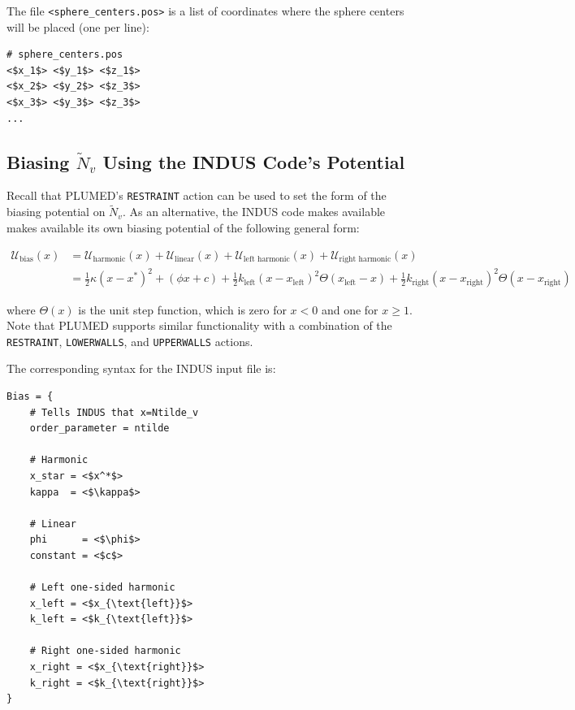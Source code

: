 \documentclass[11pt,notitlepage]{article}
\begin{document}
The file \texttt{<sphere\_centers.pos>} is a list of coordinates where the sphere centers will be placed (one per line):

\begin{lstlisting}
# sphere_centers.pos
<$x_1$> <$y_1$> <$z_1$>
<$x_2$> <$y_2$> <$z_3$>
<$x_3$> <$y_3$> <$z_3$>
...
\end{lstlisting}


\subsection{Biasing $\tilde{N}_v$ Using the INDUS Code's Potential}

Recall that PLUMED's \texttt{RESTRAINT} action can be used to set the form of the biasing potential on $\tilde{N}_v$. As an alternative, the INDUS code makes available makes available its own biasing potential of the following general form:

\begin{align}
	\mathcal{U}_{\text{bias}}(x) 
	&= \mathcal{U}_{\text{harmonic}}(x) + \mathcal{U}_{\text{linear}}(x)
	     + \mathcal{U}_{\text{left harmonic}}(x) + \mathcal{U}_{\text{right harmonic}}(x) \\
	\label{eqn:generalbias}
	&= \frac{1}{2} \kappa (x - x^*)^2 + (\phi x + c)
	   + \frac{1}{2} k_{\text{left}}  (x - x_{\text{left}})^2 \Theta(x_{\text{left}} - x)
	   + \frac{1}{2} k_{\text{right}} (x - x_{\text{right}})^2 \Theta(x - x_{\text{right}})
\end{align}

\noindent where $\Theta(x)$ is the unit step function, which is zero for $x < 0$ and one for $x \ge 1$. Note that PLUMED supports similar functionality with a combination of the \texttt{RESTRAINT}, \texttt{LOWERWALLS}, and \texttt{UPPERWALLS} actions.

The corresponding syntax for the INDUS input file is:

\begin{lstlisting}
Bias = {
	# Tells INDUS that x=Ntilde_v
	order_parameter = ntilde

	# Harmonic
	x_star = <$x^*$>
	kappa  = <$\kappa$>

	# Linear
	phi      = <$\phi$>
	constant = <$c$>

	# Left one-sided harmonic
	x_left = <$x_{\text{left}}$>
	k_left = <$k_{\text{left}}$>

	# Right one-sided harmonic
	x_right = <$x_{\text{right}}$>
	k_right = <$k_{\text{right}}$>
}
\end{lstlisting}
\end{document}
